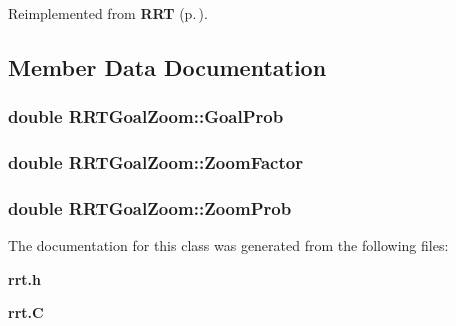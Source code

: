 Reimplemented from {\bf RRT} {\rm (p.\,\pageref{classRRT_b4})}.

\subsection{Member Data Documentation}
\subsubsection{\setlength{\rightskip}{0pt plus 5cm}double RRTGoal\-Zoom::Goal\-Prob}\label{classRRTGoalZoom_m0}


\subsubsection{\setlength{\rightskip}{0pt plus 5cm}double RRTGoal\-Zoom::Zoom\-Factor}\label{classRRTGoalZoom_m2}


\subsubsection{\setlength{\rightskip}{0pt plus 5cm}double RRTGoal\-Zoom::Zoom\-Prob}\label{classRRTGoalZoom_m1}




The documentation for this class was generated from the following files:\begin{CompactItemize}
\item 
{\bf rrt.h}\item 
{\bf rrt.C}\end{CompactItemize}

